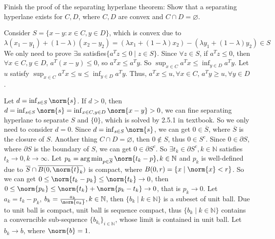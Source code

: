 \documentclass{ctexart}
\begin{document}
\begin{problem}\label{pro:2.22}
  Finish the proof of the separating hyperlane theorem: Show that
  a separating hyperlane exists for \(C,D \), where \(C, D \) are convex and
  \(C \cap D = \varnothing \).
\end{problem}
\begin{solution}
  Consider \(S=\{x-y:x \in C, y \in D\} \), which is convex due to \(\lambda(x_1-y_1) + (1-\lambda)(x_2-y_{2})=(\lambda x_{1} + (1-\lambda)x_{2}) -(\lambda y_{1} + (1-\lambda)y_{2}) \in S \)
  We only need to prove \(\exists a \) satisfies\( \{a^Tz \leq 0 \mid z \in S\} \).
  Since \(\forall z \in S \), if \(a^T z \leq 0 \), then \(\forall x \in C, y \in D \), \(a^T(x-y) \leq 0 \), so \(a^T x \leq a^Ty \).
  So \(\sup_{x \in C} a^Tx \leq \inf_{y \in D} a^Ty \). Let \(u \) satisfy \(\sup_{x \in C} a^Tx \leq u \leq \inf_{y \in D} a^Ty \).
  Thus, \(a^Tx \leq u, \forall x \in C \), \(a^T y \geq u, \forall y \in D \).

  Let \(d = \inf_{s \in S} \norm{s} \).
  If \(d >0 \), then \(d= \inf_{s \in S}\norm{s}=\inf_{x \in C,y \in D}\norm{x-y} >0 \),
  we can fine separating hyperlane to separate \(S \) and \(\{0\} \),
  which is solved by 2.5.1 in textbook.
  So we only need to
  consider \(d=0 \). Since \(d=\inf_{s \in S} \norm{s} \), we can get \(0 \in \overline{S} \), where \(\overline{S} \) is
  the closure of \(S \). Another thing \( C \cap D =\varnothing \), then \(0 \notin S \), thus \( 0 \in S^c \).
  Since  \(0 \in \partial S   \), where \(\partial S \) is the boundary of \(S \), we can get \(0 \in \partial S^c \).
  So \(\exists t_k \in \partial S^c, k \in \mathbb{N}  \) satisfies \(t_k \to 0, k \to \infty  \).
  Let \(p_k = \arg \min_{p \in \overline{S}} \norm{ t_k- p} , k \in \mathbb{N} \) and \(p_k  \) is well-defined due to  \(\overline{S} \cap \overline{B(0, \norm{t}_k}) \) is compact, where \(B(0,r)=\{x \mid \norm{x} < r\} \).
  So we can get \(0 \leq \norm{t_k - p_k} \leq \norm{t_k} \to 0\), then \(0 \leq \norm{p_k} \leq \norm{t_k} + \norm{p_k- t_k} \to 0 \), that is \(p_k \to 0 \).
  Let \(a_k=t_k-p_k \), \(b_k=\frac{a_k}{ \norm{a_k}}, k \in \mathbb{}\mathbb{N} \), then \(\{b_k \mid k \in \mathbb{N} \} \) is a subeset of unit ball.
  Due to unit ball is compact, unit ball is sequence compact, thus \(\{b_k \mid k \in \mathbb{N} \} \) contains a converncible  sub-sequence \(\{b_{k_i}\}_{i \in \mathbb{N} } \), whose limit is contained in unit ball.
  Let \(b_k \to b \), where \(\norm{b}=1 \).


\end{solution}
\end{document}
